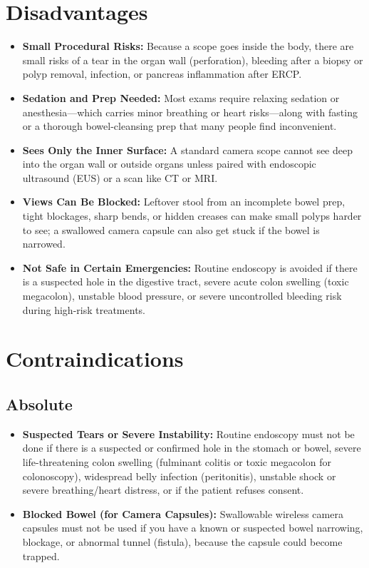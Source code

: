 \section{Disadvantages}
\begin{itemize}
\item \textbf{Small Procedural Risks:} Because a scope goes inside the body, there are small risks of a tear in the organ wall (perforation), bleeding after a biopsy or polyp removal, infection, or pancreas inflammation after ERCP.
\item \textbf{Sedation and Prep Needed:} Most exams require relaxing sedation or anesthesia---which carries minor breathing or heart risks---along with fasting or a thorough bowel-cleansing prep that many people find inconvenient.
\item \textbf{Sees Only the Inner Surface:} A standard camera scope cannot see deep into the organ wall or outside organs unless paired with endoscopic ultrasound (EUS) or a scan like CT or MRI.
\item \textbf{Views Can Be Blocked:} Leftover stool from an incomplete bowel prep, tight blockages, sharp bends, or hidden creases can make small polyps harder to see; a swallowed camera capsule can also get stuck if the bowel is narrowed.
\item \textbf{Not Safe in Certain Emergencies:} Routine endoscopy is avoided if there is a suspected hole in the digestive tract, severe acute colon swelling (toxic megacolon), unstable blood pressure, or severe uncontrolled bleeding risk during high-risk treatments.
\end{itemize}

\section{Contraindications}

\subsection{Absolute}
\begin{itemize}
\item \textbf{Suspected Tears or Severe Instability:} Routine endoscopy must not be done if there is a suspected or confirmed hole in the stomach or bowel, severe life-threatening colon swelling (fulminant colitis or toxic megacolon for colonoscopy), widespread belly infection (peritonitis), unstable shock or severe breathing/heart distress, or if the patient refuses consent.
\item \textbf{Blocked Bowel (for Camera Capsules):} Swallowable wireless camera capsules must not be used if you have a known or suspected bowel narrowing, blockage, or abnormal tunnel (fistula), because the capsule could become trapped.
\end{itemize}


